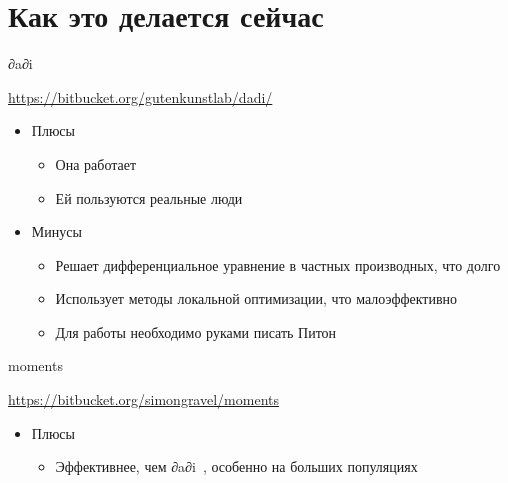 \documentclass[
  russian,
  ignorenonframetext,
]{beamer}
\providecommand{\tightlist}{%
  \setlength{\itemsep}{0pt}\setlength{\parskip}{0pt}}
\begin{document}
\hypertarget{ux43aux430ux43a-ux44dux442ux43e-ux434ux435ux43bux430ux435ux442ux441ux44f-ux441ux435ux439ux447ux430ux441}{%
\section{Как это делается
сейчас}\label{ux43aux430ux43a-ux44dux442ux43e-ux434ux435ux43bux430ux435ux442ux441ux44f-ux441ux435ux439ux447ux430ux441}}

\begin{frame}{∂a∂i\ }
\protect\hypertarget{section}{}

\url{https://bitbucket.org/gutenkunstlab/dadi/}

\begin{itemize}
\tightlist
\item
  Плюсы

  \begin{itemize}
  \tightlist
  \item
    Она работает
  \item
    Ей пользуются реальные люди
  \end{itemize}
\item
  Минусы

  \begin{itemize}
  \tightlist
  \item
    Решает дифференциальное уравнение в частных производных, что долго
  \item
    Использует методы локальной оптимизации, что малоэффективно
  \item
    Для работы необходимо руками писать Питон
  \end{itemize}
\end{itemize}

\end{frame}

\begin{frame}{moments}
\protect\hypertarget{moments}{}

\url{https://bitbucket.org/simongravel/moments}

\begin{itemize}
\tightlist
\item
  Плюсы

  \begin{itemize}
  \tightlist
  \item
    Эффективнее, чем ∂a∂i\ , особенно на больших популяциях
  \end{itemize}
\end{itemize}

\end{frame}
\end{document}
